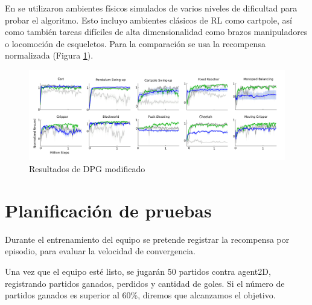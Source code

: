 En \cite{lillicrap2015continuous} se utilizaron ambientes físicos simulados de varios niveles de dificultad para probar el algoritmo. Esto incluyo ambientes clásicos de \ac{RL} como cartpole, así como también tareas difíciles de alta dimensionalidad como brazos manipuladores o locomoción de esqueletos. Para la comparación se usa la recompensa normalizada (Figura \ref{fig:modified_dpg_results}).

\begin{figure}[htb]
\centering
\includegraphics[width=150mm]{./graficos/modified_dpg_results.png}
\caption{Resultados de \ac{DPG} modificado} \label{fig:modified_dpg_results}
\end{figure}

\section{Planificación de pruebas}

Durante el entrenamiento del equipo se pretende registrar la recompensa por episodio, para evaluar la velocidad de convergencia.

Una vez que el equipo esté listo, se jugarán 50 partidos contra agent2D, registrando partidos ganados, perdidos y cantidad de goles. Si el número de partidos ganados es superior al 60\%, diremos que alcanzamos el objetivo.